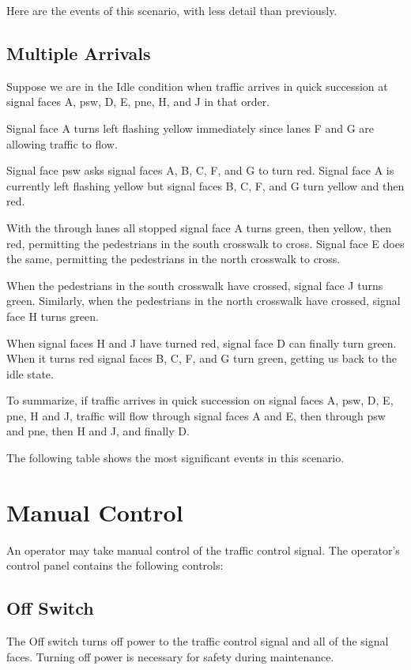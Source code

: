 \documentclass[letterpaper,twoside]{article}
\begin{document}
Here are the events of this scenario, with less detail than
previously.



\subsection{Multiple Arrivals}

Suppose we are in the Idle condition when traffic arrives in quick succession
at signal faces A, psw, D, E, pne, H, and J in that order.

Signal face A turns left flashing yellow immediately since lanes
F and G are allowing traffic to flow.

Signal face psw asks signal faces A, B, C, F, and G to turn red.
Signal face A is currently left flashing yellow but signal faces
B, C, F, and G turn yellow and then red.

With the through lanes all stopped signal face A turns
green, then yellow, then red, permitting the pedestrians in the south
crosswalk to cross.  Signal face E does the same, permitting the
pedestrians in the north crosswalk to cross.

When the pedestrians in the south crosswalk have crossed, signal
face J turns green.  Similarly, when the pedestrians in the
north crosswalk have crossed, signal face H turns green.

When signal faces H and J have turned red, signal face D
can finally turn green.  When it turns red signal faces
B, C, F, and G turn green, getting us back to the idle state.

To summarize, if traffic arrives in quick succession on signal faces
A, psw, D, E, pne, H and J, traffic will flow through signal faces
A and E, then through psw and pne, then H and J, and finally D.

The following table shows the most significant events in this scenario.



\section{Manual Control}

An operator may take manual control of the traffic control signal.
The operator's control panel contains the following controls:

\subsection{Off Switch}
The Off switch turns off power to the traffic control signal and all
of the signal faces.  Turning off power is necessary for safety during
maintenance.
\end{document}

